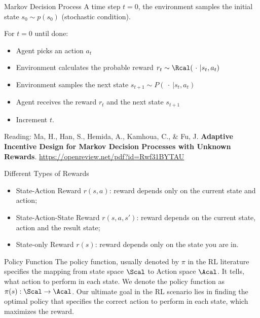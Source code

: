 \documentclass[aspectratio=169,xcolor=dvipsnames,svgnames,x11names,fleqn]{beamer}
\begin{document}
\begin{frame}{Markov Decision Process}
A time step $t=0$, the environment samples the initial state $s_0 \sim p(s_0)$ (stochastic condition).

For $t = 0$ until done: 
\begin{itemize}
    \item Agent picks an action $a_t$
    \item Environment calculates the probable reward $r_t\sim  \Rcal(~\cdot~ | s_t, a_t)$
    \item Environment samples the next state $s_{t+1}\sim P(~\cdot~ | s_t, a_t)$
    \item Agent receives the reward $r_t$ and the next state $s_{t+1}$
    \item Increment $t$.
\end{itemize}

\footnotesize
\begin{center}
    Reading: Ma, H., Han, S., Hemida, A., Kamhoua, C., \& Fu, J. \textbf{Adaptive Incentive Design for Markov Decision Processes with Unknown Rewards}. \url{https://openreview.net/pdf?id=Rwf31BYTAU}
\end{center}
    
\end{frame}

\begin{frame}{Different Types of Rewards}

    \begin{itemize}
        \item State-Action Reward $r(s,a)$: reward depends only on the current state and action;
        \item State-Action-State Reward $r(s, a, s')$: reward depends on the current state, action and the result state;
        \item  State-only Reward $r(s)$:  reward depends only on the state you are in.
    \end{itemize}
    
\end{frame}



\begin{frame}{Policy Function}
The policy function, usually denoted by $\pi$ in the RL literature specifies the mapping from state space $\Scal$ to Action space $\Acal$.
\vspace{10pt}
It tells, what action to perform in each state.
\vspace{10pt}
We denote the policy function as $\pi(s): \Scal \to \Acal$. 
\vspace{10pt}
Our ultimate goal in the RL scenario lies in finding the optimal policy that specifies the correct action to perform in each state, which maximizes the reward.

\end{frame}
\end{document}
